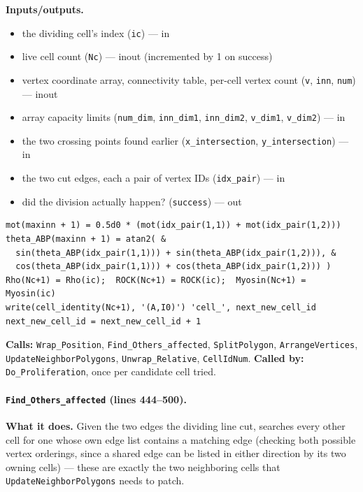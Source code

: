 \documentclass[11pt]{article}
\begin{document}
\textbf{Inputs/outputs.}
\begin{itemize}[nosep]
  \item the dividing cell's index (\texttt{ic}) --- in
  \item live cell count (\texttt{Nc}) --- inout (incremented by 1 on success)
  \item vertex coordinate array, connectivity table, per-cell vertex count (\texttt{v}, \texttt{inn}, \texttt{num}) --- inout
  \item array capacity limits (\texttt{num\_dim}, \texttt{inn\_dim1}, \texttt{inn\_dim2}, \texttt{v\_dim1}, \texttt{v\_dim2}) --- in
  \item the two crossing points found earlier (\texttt{x\_intersection}, \texttt{y\_intersection}) --- in
  \item the two cut edges, each a pair of vertex IDs (\texttt{idx\_pair}) --- in
  \item did the division actually happen? (\texttt{success}) --- out
\end{itemize}

\begin{lstlisting}[caption={Inheriting motility (plain average) and ABP heading (circular average) for the two new vertices, and the new daughter's identity, in \texttt{Proliferation\_Core}.}]
mot(maxinn + 1) = 0.5d0 * (mot(idx_pair(1,1)) + mot(idx_pair(1,2)))
theta_ABP(maxinn + 1) = atan2( &
  sin(theta_ABP(idx_pair(1,1))) + sin(theta_ABP(idx_pair(1,2))), &
  cos(theta_ABP(idx_pair(1,1))) + cos(theta_ABP(idx_pair(1,2))) )
Rho(Nc+1) = Rho(ic);  ROCK(Nc+1) = ROCK(ic);  Myosin(Nc+1) = Myosin(ic)
write(cell_identity(Nc+1), '(A,I0)') 'cell_', next_new_cell_id
next_new_cell_id = next_new_cell_id + 1
\end{lstlisting}

\textbf{Calls:} \texttt{Wrap\_Position}, \texttt{Find\_Others\_affected},
\texttt{SplitPolygon}, \texttt{ArrangeVertices}, \texttt{UpdateNeighborPolygons},
\texttt{Unwrap\_Relative}, \texttt{CellIdNum}. \textbf{Called by:}
\texttt{Do\_Proliferation}, once per candidate cell tried.

\paragraph{\texttt{Find\_Others\_affected} (lines 444--500).}
\textbf{What it does.} Given the two edges the dividing line cut, searches every other
cell for one whose own edge list contains a matching edge (checking both possible
vertex orderings, since a shared edge can be listed in either direction by its two
owning cells) --- these are exactly the two neighboring cells that
\texttt{UpdateNeighborPolygons} needs to patch.
\end{document}
